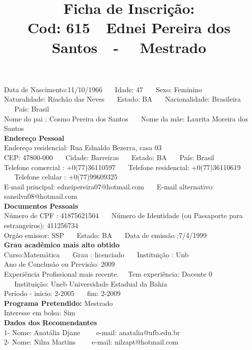 \documentclass[11pt]{article}
\title{\vspace*{-4cm} Ficha de Inscrição: \\Cod: 615\ \ Ednei  Pereira dos Santos\ \ - \ \ Mestrado 
 }
\date{}
\begin{document}
\maketitle
\vspace*{-1.5cm}
\noindent Data de Nascimento:11/10/1966
\ \ \ Idade: 47   \ \ \ Sexo: Feminino
\\
Naturalidade: Riachão das Neves  
\ \ \  Estado: BA
\ \ \  Nacionalidade: Brasileira
\ \ \ País: Brasil
\\        
Nome do pai : Cosmo Pereira dos Santos
\ \ \ Nome da mãe: Laurita Moreira dos Santos          
\\[0.2cm]                     
\textbf{Endereço Pessoal} 
\\ 
\noindent Endereço residencial: Rua Ednaldo Bezerra, casa 03
\\
        CEP: 47800-000 
\ \ \ Cidade: Barreiras 
\ \ \ Estado: BA 
\ \ \ País: Brasil
\\		
		Telefone comercial : +0(77)36110597
\ \ \ Telefone residencial: +0(77)36110619
\ \ \ Telefone celular : +0(77)99609325
\\
E-mail principal: edneipereira07@hotmail.com
\ \ \ E-mail alternativo: sansilva08@hotmail.com 
\\[0.2cm] 
\textbf{Documentos Pessoais}
\\
\noindent Número de CPF : 41875621504
\ \ \ Número de Identidade (ou Passaporte para estrangeiros): 411256734
\\
Orgão emissor: SSP
\ \ \ Estado: BA
\ \ \ Data de emissão :7/4/1999
\\[0.3cm]
\textbf{Grau acadêmico mais alto obtido}
\\	
Curso:Matemática
\ \ \ Grau : licenciado
\ \ \ Instituição : Unb
\\			
Ano de Conclusão ou Previsão: 2009
\\ 
Experiência Profissional mais recente. \ \  
Tem experiência: Docente 0  
\ \ \ Instituição: Uneb Universidade Estadual da Bahia
\\  
Período - início: 2-2005
\ \ \ fim: 2-2009
\\[0.2cm] 
\textbf{Programa Pretendido:} Mestrado\\
Interesse em bolsa: Sim
\\[0.3cm]		
\textbf{Dados dos Recomendantes} 
\\
1- Nome: Anatália Djane
\ \ \ \  e-mail: anatalia@ufb.edu.br 
\\
2- Nome: Nilza Martins
\ \ \ \ e-mail: nilzapt@hotmail.com
\\
\end{document}
